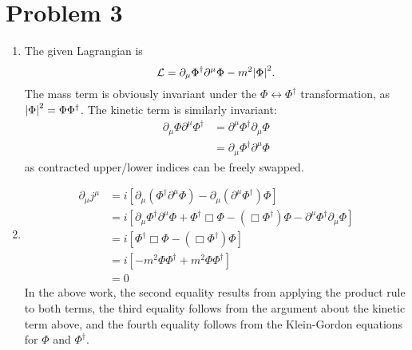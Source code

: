 \documentclass[12pt]{article}
\begin{document}
\section*{Problem 3}
\begin{enumerate}[label=(\alph*)]
    \item The given Lagrangian is
    \[ \mathcal{L} = \partial_\mu\Phi^\dag\partial^\mu\Phi - m^2\abs{\Phi}^2. \]
    The mass term is obviously invariant under the $\Phi \leftrightarrow \Phi^\dag$ transformation, as $\abs{\Phi}^2 = \Phi\Phi^\dag$. The kinetic term is similarly invariant:
    \begin{align*}
        \partial_\mu\Phi\partial^\mu\Phi^\dag &= \partial^\mu\Phi^\dag\partial_\mu\Phi \\
        &= \partial_\mu\Phi^\dag\partial^\mu\Phi
    \end{align*}
    as contracted upper/lower indices can be freely swapped.

    \item
    \begin{align*}
        \partial_\mu j^\mu &= i\left[\partial_\mu\left(\Phi^\dag\partial^\mu\Phi\right) - \partial_\mu\left(\partial^\mu\Phi^\dag\right)\Phi\right] \\
        &= i\left[\partial_\mu\Phi^\dag\partial^\mu\Phi + \Phi^\dag\Box\Phi - \left(\Box\Phi^\dag\right)\Phi - \partial^\mu\Phi^\dag\partial_\mu\Phi\right] \\
        &= i\left[\Phi^\dag\Box\Phi - \left(\Box\Phi^\dag\right)\Phi\right] \\
        &= i\left[-m^2\Phi\Phi^\dag + m^2\Phi\Phi^\dag\right] \\
        &= 0
    \end{align*}
    In the above work, the second equality results from applying the product rule to both terms, the third equality follows from the argument about the kinetic term above, and the fourth equality follows from the Klein-Gordon equations for $\Phi$ and $\Phi^\dag$.
\end{enumerate}
\end{document}
